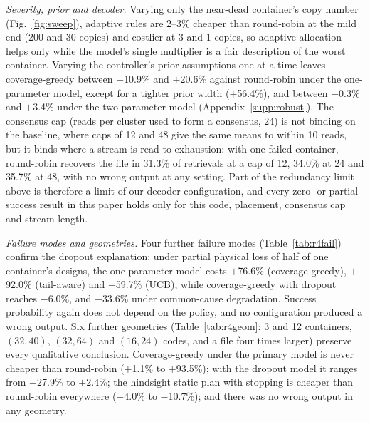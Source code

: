 \documentclass[acmsmall,screen]{acmart}
\begin{document}
\emph{Severity, prior and decoder.}  Varying only the near-dead container's copy number
(Fig.~\ref{fig:sweep}), adaptive rules are 2--3\% cheaper than round-robin at the mild end
(200 and 30 copies) and costlier at 3 and 1 copies, so adaptive allocation helps only while the model's
single multiplier is a fair description of the worst container.  Varying the controller's prior
assumptions one at a time leaves coverage-greedy between $+$10.9\% and $+$20.6\% against round-robin
under the one-parameter model, except for a tighter prior width ($+$56.4\%), and between $-$0.3\% and
$+$3.4\% under the two-parameter model (Appendix~\ref{supp:robust}).  The consensus cap
(reads per cluster used to form a consensus, 24) is not binding on the baseline, where caps of 12 and 48
give the same means to within 10 reads, but it binds where a stream is read to exhaustion: with one
failed container, round-robin recovers the file in 31.3\% of retrievals at a cap of 12, 34.0\% at 24 and
35.7\% at 48, with no wrong output at any setting.  Part of the redundancy limit above is therefore a
limit of our decoder configuration, and every zero- or partial-success result in this paper holds only
for this code, placement, consensus cap and stream length.

\emph{Failure modes and geometries.}  Four further failure modes (Table~\ref{tab:r4fail})
confirm the dropout explanation: under partial physical loss of half of one container's designs, the
one-parameter model costs $+$76.6\% (coverage-greedy), $+$92.0\% (tail-aware) and $+$59.7\% (UCB), while
coverage-greedy with dropout reaches $-$6.0\%, and $-$33.6\% under common-cause degradation.  Success
probability again does not depend on the policy, and no configuration produced a wrong output.  Six
further geometries (Table~\ref{tab:r4geom}: 3 and 12 containers, $(32,40)$, $(32,64)$ and
$(16,24)$ codes, and a file four times larger) preserve every qualitative conclusion.  Coverage-greedy
under the primary model is never cheaper than round-robin ($+$1.1\% to $+$93.5\%); with the dropout model
it ranges from $-$27.9\% to $+$2.4\%; the hindsight static plan with stopping is cheaper than round-robin
everywhere ($-$4.0\% to $-$10.7\%); and there was no wrong output in any geometry.
\end{document}
